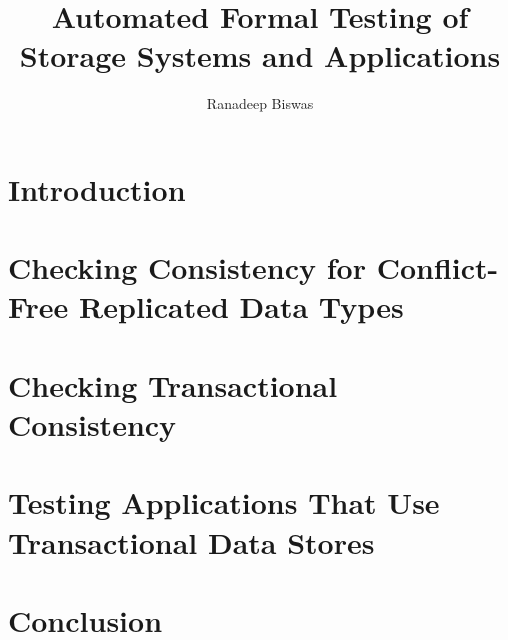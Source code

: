 \documentclass{mimosis}
\title{Automated Formal Testing of Storage Systems and Applications}
\subtitle{} %
\author{Ranadeep Biswas}
\begin{document}
\frontmatter  
  


  \tableofcontents

\mainmatter

  \chapter{Introduction}

  

  \chapter{Checking Consistency for Conflict-Free Replicated Data Types}
  \label{chap:crdt}

  
  
  
  
  
  
  
  

  \chapter{Checking Transactional Consistency}
  \label{chap:txn}

  
%  
  
  
  
  
  

  \chapter{Testing Applications That Use Transactional Data Stores}
  \label{chap:dist-app}

  
  
  
  
  
  
  
  
  

  \chapter{Conclusion}
  \label{chap:conclusion}
  

\backmatter


  \printindex
  \printbibliography
\end{document}
